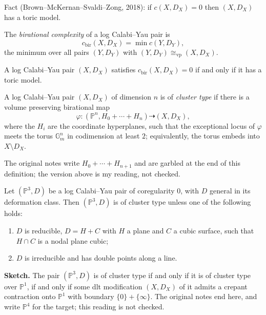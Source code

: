 Fact (Brown--McKernan--Svaldi--Zong, 2018):
if $c(X,D_X)=0$ then $(X,D_X)$ has a toric
model.

\begin{definition}
\label{definition-alves-bir-complexity}
The \emph{birational complexity} of a log
Calabi--Yau pair is
$$
c_{\operatorname{bir}}(X,D_X)
=\min c(Y,D_Y),
$$
the minimum over all pairs $(Y,D_Y)$ with
$(Y,D_Y)\cong_{\operatorname{vp}}(X,D_X)$.
\end{definition}

\begin{theorem}
\label{theorem-alves-mauri-moraga}
A log Calabi--Yau pair $(X,D_X)$ satisfies
$c_{\operatorname{bir}}(X,D_X)=0$ if and only
if it has a toric model.
\end{theorem}

\begin{definition}
\label{definition-alves-cluster-type}
A log Calabi--Yau pair $(X,D_X)$ of
dimension $n$ is of \emph{cluster type} if
there is a volume preserving birational map
$$
\varphi\colon
(\mathbb{P}^n,H_0+\cdots+H_n)
\dashrightarrow (X,D_X),
$$
where the $H_i$ are the coordinate
hyperplanes, such that the exceptional
locus of $\varphi$ meets the torus
$\mathbb{G}_m^n$ in codimension at least
$2$; equivalently, the torus embeds into
$X\setminus D_X$.
\end{definition}

The original notes write $H_0+\cdots+H_{n+1}$
and are garbled at the end of this
definition; the version above is my reading,
not checked.

\begin{theorem}
\label{theorem-alves-cluster-p3}
Let $(\mathbb{P}^3,D)$ be a log Calabi--Yau
pair of coregularity $0$, with $D$ general
in its deformation class. Then
$(\mathbb{P}^3,D)$ is of cluster type unless
one of the following holds:
\begin{enumerate}
\item $D$ is reducible, $D=H+C$ with $H$ a
plane and $C$ a cubic surface, such that
$H\cap C$ is a nodal plane cubic;
\item $D$ is irreducible and has double
points along a line.
\end{enumerate}
\end{theorem}

\medskip\noindent
{\bf Sketch.} The pair $(\mathbb{P}^3,D)$ is
of cluster type if and only if it is of
cluster type over $\mathbb{P}^1$, if and only
if some dlt modification $(X,D_X)$ of it
admits a crepant contraction onto
$\mathbb{P}^1$ with boundary
$\{0\}+\{\infty\}$. The original notes end
here, and write $\mathbb{P}^4$ for the
target; this reading is not checked.



